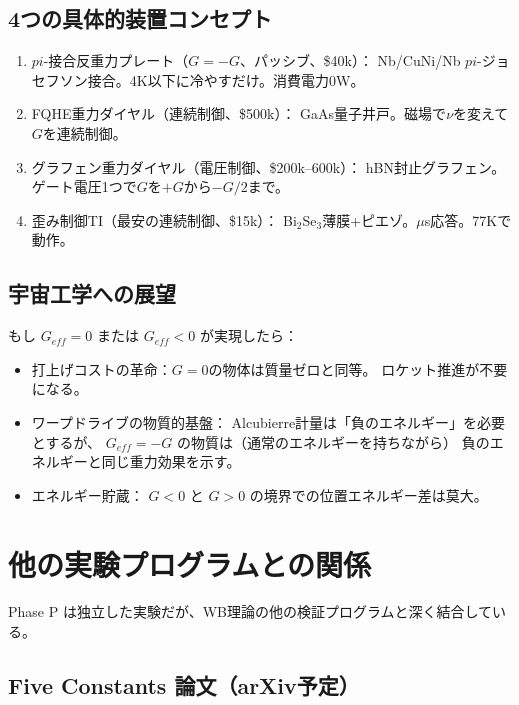\documentclass[11pt,a4paper]{article}
\def\pi{pi}%
\def\mathrm#1{#1}%
\def\textbf#1{#1}%
\begin{document}
\subsection{4つの具体的装置コンセプト}

\begin{enumerate}
\item \textbf{$\pi$-接合反重力プレート}（$G=-G$、パッシブ、\$40k）：
  Nb/CuNi/Nb $\pi$-ジョセフソン接合。4K以下に冷やすだけ。消費電力0W。

\item \textbf{FQHE重力ダイヤル}（連続制御、\$500k）：
  GaAs量子井戸。磁場で$\nu$を変えて$G$を連続制御。

\item \textbf{グラフェン重力ダイヤル}（電圧制御、\$200k--600k）：
  hBN封止グラフェン。ゲート電圧1つで$G$を$+G$から$-G/2$まで。

\item \textbf{歪み制御TI}（最安の連続制御、\$15k）：
  Bi$_2$Se$_3$薄膜+ピエゾ。$\mu$s応答。77Kで動作。
\end{enumerate}

\subsection{宇宙工学への展望}

もし $G_{\mathrm{eff}} = 0$ または $G_{\mathrm{eff}} < 0$ が実現したら：

\begin{itemize}
\item \textbf{打上げコストの革命}：$G=0$の物体は質量ゼロと同等。
  ロケット推進が不要になる。
\item \textbf{ワープドライブの物質的基盤}：
  Alcubierre計量は「負のエネルギー」を必要とするが、
  $G_{\mathrm{eff}} = -G$ の物質は（通常のエネルギーを持ちながら）
  負のエネルギーと同じ重力効果を示す。
\item \textbf{エネルギー貯蔵}：
  $G<0$ と $G>0$ の境界での位置エネルギー差は莫大。
\end{itemize}


\section{他の実験プログラムとの関係}

Phase P は独立した実験だが、WB理論の他の検証プログラムと深く結合している。

\subsection{Five Constants 論文（arXiv予定）}
\end{document}
